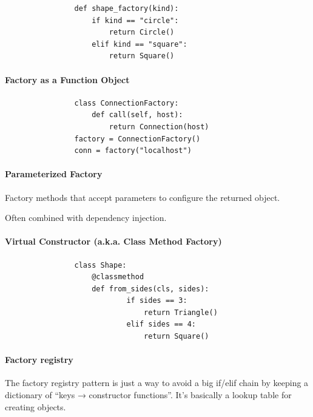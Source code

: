 \documentclass[a4paper]{article}
\begin{document}
            \begin{verbatim}
                def shape_factory(kind):
                    if kind == "circle":
                        return Circle()
                    elif kind == "square":
                        return Square()
            \end{verbatim}
        
        \paragraph{Factory as a Function Object}
            
            \begin{verbatim}
                class ConnectionFactory:
                    def call(self, host):
                        return Connection(host)
                factory = ConnectionFactory()
                conn = factory("localhost")
            \end{verbatim}
        
        \paragraph{Parameterized Factory}
            
            Factory methods that accept parameters to configure the returned object.
            
            Often combined with dependency injection.
        
        \paragraph{Virtual Constructor (a.k.a. Class Method Factory)}
            
            \begin{verbatim}
                class Shape:
                    @classmethod
                    def from_sides(cls, sides):
                            if sides == 3:
                                return Triangle()
                            elif sides == 4:
                                return Square()
            \end{verbatim}
        
        \paragraph{Factory registry}
            
            The factory registry pattern is just a way to avoid a big if/elif chain by keeping a dictionary of “keys → constructor functions”. It’s basically a lookup table for creating objects.
            
\end{document}
